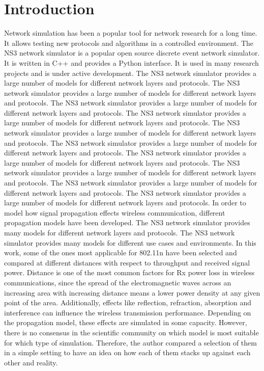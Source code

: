 \section[short]{Introduction}

Network simulation has been a popular tool for network research for a long time. It allows testing new protocols and algorithms in a controlled environment. The NS3 network simulator is a popular open source discrete event network simulator. It is written in C++ and provides a Python interface. It is used in many research projects and is under active development. The NS3 network simulator provides a large number of models for different network layers and protocols. The NS3 network simulator provides a large number of models for different network layers and protocols. The NS3 network simulator provides a large number of models for different network layers and protocols. The NS3 network simulator provides a large number of models for different network layers and protocols. The NS3 network simulator provides a large number of models for different network layers and protocols. The NS3 network simulator provides a large number of models for different network layers and protocols. The NS3 network simulator provides a large number of models for different network layers and protocols. The NS3 network simulator provides a large number of models for different network layers and protocols. The NS3 network simulator provides a large number of models for different network layers and protocols. The NS3 network simulator provides a large number of models for different network layers and protocols.
In order to model how signal propagation effects wireless communication, different propagation models have been 
developed. The NS3 network simulator provides many models for different network layers and protocols. The NS3 network simulator provides many models for different 
use cases and environments. In this work, some of the ones most applicable for 802.11n have been selected and compared at different 
distances with respect to throughput and received signal power. Distance is one of the most common factors for Rx power loss in wireless communications, since 
the spread of the electromagnetic waves across an increasing area with increasing distance means a lower power density at any given point of the 
area. Additionally, effects like reflection, refraction, absorption and interference can influence the wireless transmission performance.
Depending on the propagation model, these effects are simulated in some capacity. However, there is no consensus in the scientific community on 
which model is most suitable for which type of simulation. Therefore, the author compared a selection of them in a simple setting to have an idea 
on how each of them stacks up against each other and reality.